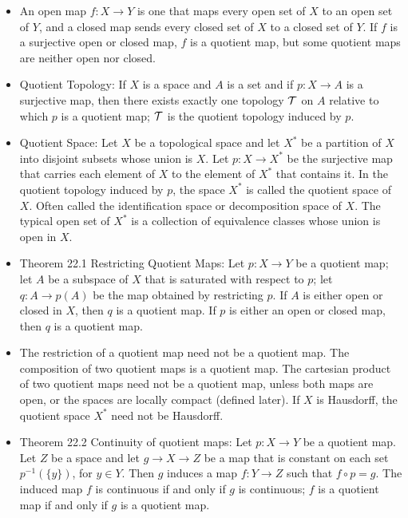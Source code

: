 \documentclass[12pt,letterpaper]{article}
\begin{document}
\begin{enumerate}
\begin{itemize}
    \item \label{dfn:OpenClosedMap} An open map $f:X\rightarrow Y$ is one that maps every open set of $X$ to an open set of $Y$, and a closed map sends every closed set of $X$ to a closed set of $Y$. If $f$ is a surjective open or closed map, $f$ is a quotient map, but some quotient maps are neither open nor closed.
    \item \label{dfn:quotientTopology} Quotient Topology: If $X$ is a space and $A$ is a set and if $p: X\rightarrow A$ is a surjective map, then there exists exactly one topology $\mathcal{T}$ on $A$ relative to which $p$ is a quotient map; $\mathcal{T}$ is the quotient topology induced by $p$.
    \item \label{dfn:quotientSpace} Quotient Space: Let $X$ be a topological space and let $X^*$ be a partition of $X$ into disjoint subsets whose union is $X$. Let $p: X\rightarrow X^*$ be the surjective map that carries each element of $X$ to the element of $X^*$ that contains it. In the quotient topology induced by $p$, the space $X^*$ is called the quotient space of $X$. Often called the identification space or decomposition space of $X$. The typical open set of $X^*$ is a collection of equivalence classes whose union is open in $X$.
    \item \label{thm:restrictionQuotientMap} Theorem 22.1 Restricting Quotient Maps: Let $p: X\rightarrow Y$ be a quotient map; let $A$ be a subspace of $X$ that is saturated with respect to $p$; let $q: A\rightarrow p(A)$ be the map obtained by restricting $p$. If $A$ is either open or closed in $X$, then $q$ is a quotient map. If $p$ is either an open or closed map, then $q$ is a quotient map.
    \item \label{thm:quotientMapGeneralProperties} The restriction of a quotient map need not be a quotient map. The composition of two quotient maps is a quotient map. The cartesian product of two quotient maps need not be a quotient map, unless both maps are open, or the spaces are locally compact (defined later). If $X$ is Hausdorff, the quotient space $X^*$ need not be Hausdorff.
    \item \label{thm:continuityQuotientMap} Theorem 22.2 Continuity of quotient maps: Let $p: X\rightarrow Y$ be a quotient map. Let $Z$ be a space and let $g\rightarrow X\rightarrow Z$ be a map that is constant on each set $p^{-1}(\{y\})$, for $y\in Y$. Then $g$ induces a map $f:Y\rightarrow Z$ such that $f\circ p = g$. The induced map $f$ is continuous if and only if $g$ is continuous; $f$ is a quotient map if and only if $g$ is a quotient map.

\end{itemize}
\end{enumerate}
\end{document}
